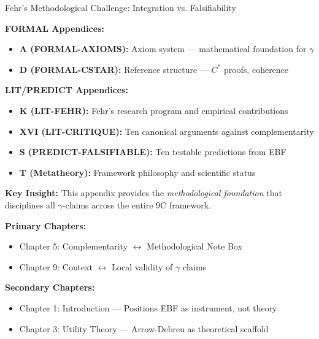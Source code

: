 \begin{chapter}{Fehr's Methodological Challenge: Integration vs. Falsifiability}
\begin{tcolorbox}[colback=blue!5!white,colframe=blue!75!black,title=\textbf{Cross-Reference Map}]
\textbf{FORMAL Appendices:}
\begin{itemize}[noitemsep]
    \item \textbf{A (FORMAL-AXIOMS):} Axiom system --- mathematical foundation for $\gamma$
    \item \textbf{D (FORMAL-CSTAR):} Reference structure --- $C^*$ proofs, coherence
\end{itemize}

\textbf{LIT/PREDICT Appendices:}
\begin{itemize}[noitemsep]
    \item \textbf{K (LIT-FEHR):} Fehr's research program and empirical contributions
    \item \textbf{XVI (LIT-CRITIQUE):} Ten canonical arguments against complementarity
    \item \textbf{S (PREDICT-FALSIFIABLE):} Ten testable predictions from EBF
    \item \textbf{T (Metatheory):} Framework philosophy and scientific status
\end{itemize}

\textbf{Key Insight:} This appendix provides the \textit{methodological foundation} that disciplines all $\gamma$-claims across the entire 9C framework.
\end{tcolorbox}

\begin{tcolorbox}[colback=purple!5!white, colframe=purple!75!black,
    title=Chapter Linkage]

\textbf{Primary Chapters:}
\begin{itemize}[nosep]
\item Chapter 5: Complementarity $\leftrightarrow$ Methodological Note Box
\item Chapter 9: Context $\leftrightarrow$ Local validity of $\gamma$ claims
\end{itemize}

\textbf{Secondary Chapters:}
\begin{itemize}[nosep]
\item Chapter 1: Introduction --- Positions EBF as instrument, not theory
\item Chapter 3: Utility Theory --- Arrow-Debreu as theoretical scaffold
\end{itemize}


\end{tcolorbox}
\end{chapter}
